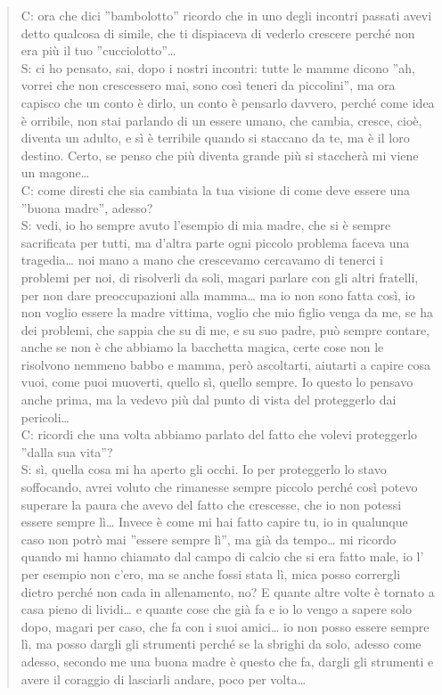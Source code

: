 \begin{verse}
C: ora che dici ''bambolotto'' ricordo che in uno degli incontri passati avevi detto qualcosa di simile, che ti dispiaceva di vederlo crescere perché non era più il tuo ''cucciolotto''\ldots{}\\
S: ci ho pensato, sai, dopo i nostri incontri: tutte le mamme dicono ''ah, vorrei che non crescessero mai, sono così teneri da piccolini'', ma ora capisco che un conto è dirlo, un conto è pensarlo davvero, perché come idea è orribile, non stai parlando di un essere umano, che cambia, cresce, cioè, diventa un adulto, e sì è terribile quando si staccano da te, ma è il loro destino. Certo, se penso che più diventa grande più si staccherà mi viene un magone\ldots{}\\
C: come diresti che sia cambiata la tua visione di come deve essere una ''buona madre'', adesso?\\
S: vedi, io ho sempre avuto l'esempio di mia madre, che si è sempre sacrificata per tutti, ma d'altra parte ogni piccolo problema faceva una tragedia\ldots{} noi mano a mano che crescevamo cercavamo di tenerci i problemi per noi, di risolverli da soli, magari parlare con gli altri fratelli, per non dare preoccupazioni alla mamma\ldots{} ma io non sono fatta così, io non voglio essere la madre vittima, voglio che mio figlio venga da me, se ha dei problemi, che sappia che su di me, e su suo padre, può sempre contare, anche se non è che abbiamo la bacchetta magica, certe cose non le risolvono nemmeno babbo e mamma, però ascoltarti, aiutarti a capire cosa vuoi, come puoi muoverti, quello sì, quello sempre. Io questo lo pensavo anche prima, ma la vedevo più dal punto di vista del proteggerlo dai pericoli\ldots\\
C: ricordi che una volta abbiamo parlato del fatto che volevi proteggerlo ''dalla sua vita''?\\
S: sì, quella cosa mi ha aperto gli occhi. Io per proteggerlo lo stavo soffocando, avrei voluto che rimanesse sempre piccolo perché così potevo superare la paura che avevo del fatto che crescesse, che io non potessi essere sempre lì\ldots{} Invece è come mi hai fatto capire tu, io in qualunque caso non potrò mai ''essere sempre lì'', ma già da tempo\ldots{} mi ricordo quando mi hanno chiamato dal campo di calcio che si era fatto male, io l' per esempio non c'ero, ma se anche fossi stata lì, mica posso corrergli dietro perché non cada in allenamento, no? E quante altre volte è tornato a casa pieno di lividi\ldots{} e quante cose che già  fa e io lo vengo a sapere solo dopo, magari per caso, che fa con i suoi amici\ldots{} io non posso essere sempre lì, ma posso dargli gli strumenti perché se la sbrighi da solo, adesso come adesso, secondo me una buona madre è questo che fa, dargli gli strumenti e avere il coraggio di lasciarli andare, poco per volta\ldots\\

\end{verse}

